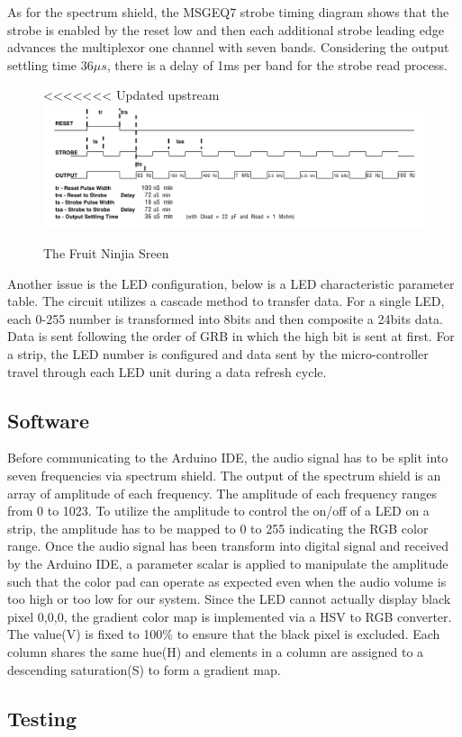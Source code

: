 \documentclass[12pt,a4paper,journal]{IEEEtran}
\begin{document}
As for the spectrum shield, the MSGEQ7 strobe timing diagram shows that the strobe is enabled by the reset low and then each additional strobe leading edge advances the multiplexor one channel with seven bands. Considering the output settling time $36\mu s$, there is a delay of 1ms per band for the strobe read process.
\begin{figure}
<<<<<<< Updated upstream
  \includegraphics[width=0.7\linewidth]{timing1.png}
  \caption{The Fruit Ninjia Sreen}
\end{figure}
Another issue is the LED configuration, below is a LED characteristic parameter table. The circuit utilizes a cascade method to transfer data. For a single LED, each 0-255 number is transformed into 8bits and then composite a 24bits data. Data is sent following the order of GRB in which the high bit is sent at first. For a strip, the LED number is configured and data sent by the micro-controller travel through each LED unit during a data refresh cycle.\subsection{Software}
Before communicating to the Arduino IDE, the audio signal has to be split into seven frequencies via spectrum shield. The output of the spectrum shield is an array of amplitude of each frequency. The amplitude of each frequency ranges from 0 to 1023. To utilize the amplitude to control the on/off of a LED on a strip, the amplitude has to be mapped to 0 to 255 indicating the RGB color range. Once the audio signal has been transform into digital signal and received by the Arduino IDE, a parameter scalar is applied to manipulate the amplitude such that the color pad can operate as expected even when the audio volume is too high or too low for our system. Since the LED cannot actually display black pixel {0,0,0}, the gradient color map is implemented via a HSV to RGB converter. The value(V) is fixed to 100\% to ensure that the black pixel is excluded. Each column shares the same hue(H) and elements in a column are assigned to a descending saturation(S) to form a gradient map.
\subsection{Testing}
\end{document}
